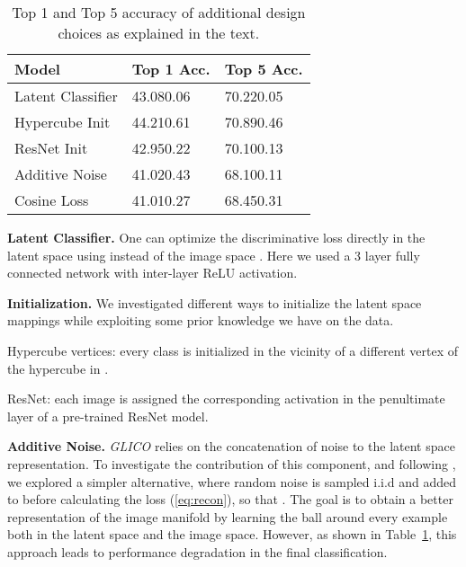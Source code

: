 \documentclass[a4paper,conference]{IEEEtran}
\begin{document}
\begin{table}[htbp]
	\centering
	\caption{Top 1 and Top 5 accuracy of additional design choices as explained in the text. 
		\label{tab:alternatives}}
	\begin{tabular}{l|ll}
		Model             & Top 1 Acc.     & Top 5 Acc.     \\
		\toprule
		Latent Classifier & 43.080.06 & 70.220.05 \\
		Hypercube Init    & 44.210.61 & 70.890.46 \\
		ResNet Init       & 42.950.22 & 70.100.13 \\
Additive Noise    & 41.020.43 & 68.100.11 \\
Cosine Loss       & 41.010.27 & 68.450.31 \\
										
		\bottomrule
	\end{tabular}
		
\end{table}

\textbf{Latent Classifier.} One can optimize the discriminative loss  directly in the latent space using  instead of the image space  . Here we used a 3 layer fully connected network with inter-layer ReLU activation.

\textbf{ Initialization.} We investigated different ways to initialize the latent space mappings while exploiting some prior knowledge we have on the data. \begin{enumerate*}[label={\roman*)},font={\color{black}\bfseries}]
\item Hypercube vertices: every class is initialized in the vicinity of a different vertex of the hypercube in . \item ResNet: each image is assigned the corresponding activation in the penultimate layer of a pre-trained ResNet model.\end{enumerate*}


\textbf{Additive Noise.} \textit{GLICO} relies on the concatenation of noise to the latent space representation. To investigate the contribution of this component, and following \cite{noise2noise}, we explored a simpler alternative, where random noise  is sampled i.i.d and added to  before calculating the loss (\ref{eq:recon}), so that . The goal is to obtain a better representation of the image manifold by learning the  ball around every example both in the latent space and the image space. However, as shown in Table~\ref{tab:alternatives}, this approach leads to performance degradation in the final classification. 
\end{document}
